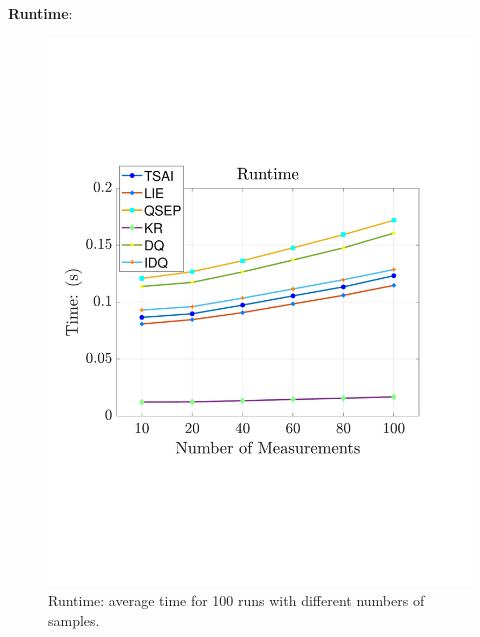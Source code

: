 \documentclass[a4paper]{report}
\begin{document}
\textbf{Runtime}:
\begin{figure}
\centering
\includegraphics[scale=0.4]{./hand_eye_figures/conv/conv_runtime_cmp}
\caption{Runtime: average time for 100 runs with different numbers of samples.}
\end{figure}
\end{document}
